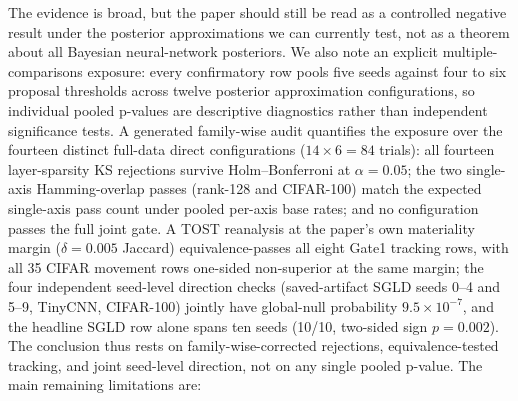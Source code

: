 \documentclass{article}
\begin{document}
The evidence is broad, but the paper should still be read as a controlled
negative result under the posterior approximations we can currently test, not
as a theorem about all Bayesian neural-network posteriors. We also note an
explicit multiple-comparisons exposure: every confirmatory row pools five
seeds against four to six proposal thresholds across twelve posterior
approximation configurations, so individual pooled p-values are descriptive
diagnostics rather than independent significance tests. A generated
family-wise audit quantifies the exposure over the fourteen distinct
full-data direct configurations ($14 \times 6 = 84$ trials): all fourteen
layer-sparsity KS rejections survive Holm--Bonferroni at $\alpha = 0.05$;
the two single-axis Hamming-overlap passes (rank-128 and CIFAR-100) match
the expected single-axis pass count under pooled per-axis base rates; and no
configuration passes the full joint gate. A TOST reanalysis at the paper's
own materiality margin ($\delta = 0.005$ Jaccard) equivalence-passes all
eight Gate1 tracking rows, with all 35 CIFAR movement rows one-sided
non-superior at the same margin; the four independent seed-level direction
checks (saved-artifact SGLD seeds 0--4 and 5--9, TinyCNN, CIFAR-100)
jointly have global-null probability $9.5 \times 10^{-7}$, and the
headline SGLD row alone spans ten seeds (10/10, two-sided sign
$p = 0.002$). The conclusion thus rests on
family-wise-corrected rejections, equivalence-tested tracking, and joint
seed-level direction, not on any single pooled p-value. The
main remaining limitations are:
\end{document}
